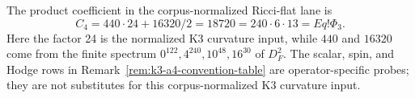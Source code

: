 \makeatletter
{}
\makeatother

\begin{theorem}
\label{thm:k3-w33-metric-bridge}
The product coefficient in the corpus-normalized Ricci-flat lane is
\[
C_4=440\cdot24+16320/2=18720=240\cdot6\cdot13=E q!\Phi_3.
\]
Here the factor 24 is the normalized K3 curvature input, while
$440$ and $16320$ come from the finite spectrum
$0^{122},4^{240},10^{48},16^{30}$ of $D_F^2$.
The scalar, spin, and Hodge rows in Remark~\ref{rem:k3-a4-convention-table}
are operator-specific probes; they are not substitutes for this corpus-normalized
K3 curvature input.
\end{theorem}
